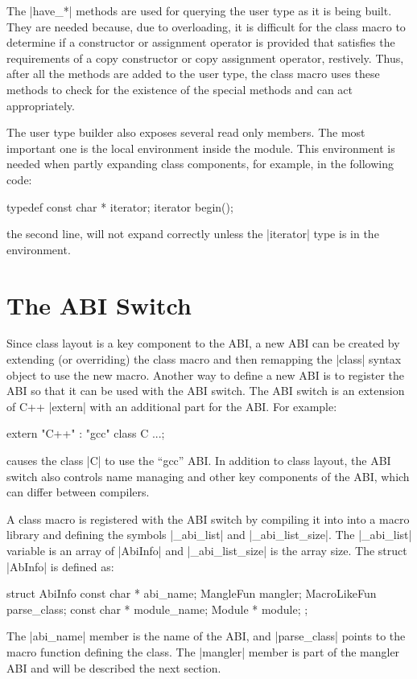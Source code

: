 The |have_*| methods are used for querying the user type as it is
being built.  They are needed because, due to overloading, it is
difficult for the class macro to determine if a constructor or
assignment operator is provided that satisfies the requirements of a
copy constructor or copy assignment operator, restively.  Thus, after
all the methods are added to the user type, the class macro uses these
methods to check for the existence of the special methods and can act
appropriately.

The user type builder also exposes several read only members.  The
most important one is the local environment inside the module.  This
environment is needed when partly expanding class components, for
example, in the following code:
\begin{code}
typedef const char * iterator;
iterator begin();
\end{code}
the second line, will not expand correctly unless the |iterator| type
is in the environment.  


\section{The ABI Switch}
\label{abi-switch}

Since class layout is a key component to the ABI, a new ABI can be
created by extending (or overriding) the class macro and then
remapping the |class| syntax object to use the new macro.  Another way
to define a new ABI is to register the ABI so that it can be used with
the ABI switch.  The ABI switch is an extension of C++ |extern| with
an additional part for the ABI.  For example:
\begin{code}
extern "C++" : "gcc"
class C {...};
\end{code}
causes the class |C| to use the ``gcc'' ABI.  In addition to class
layout, the ABI switch also controls name managing and other key
components of the ABI, which can differ between compilers.

A class macro is registered with the ABI switch by compiling it 
into into a macro library and defining the symbols |_abi_list| and
|_abi_list_size|.  The |_abi_list| variable is an array of |AbiInfo| and
|_abi_list_size| is the array size.  The struct |AbInfo| is defined as:
\begin{code}
struct AbiInfo {
  const char * abi_name;
  MangleFun mangler;
  MacroLikeFun parse_class;
  const char * module_name;
  Module * module;
};
\end{code}
The |abi_name| member is the name of the ABI, and |parse_class| points
to the macro function defining the class.  The |mangler| member is
part of the mangler ABI and will be described the next section.

